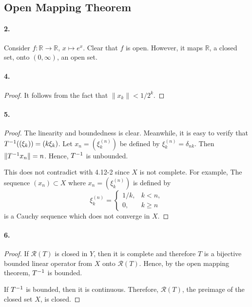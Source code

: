 \subsection{Open Mapping Theorem}
  \paragraph{2.}
  \begin{solution}
    Consider $f:\mathbb{R}\to\mathbb{R}$, $x\mapsto e^x$. Clear that $f$ is 
    open. However, it maps $\mathbb{R}$, a closed set, onto $(0,\infty)$, an 
    open set.
  \end{solution}
  
  \paragraph{4.}
  \begin{proof}
    It follows from the fact that $\|x_k\|<1/2^k$.
  \end{proof}
  
  \paragraph{5.}
  \begin{proof}
    The linearity and boundedness is clear. Meanwhile, it is easy to verify that
    $T^{-1}((\xi_k))=(k\xi_k)$. Let $x_n=(\xi_k^{(n)})$ be defined by $\xi_k
    ^{(n)}=\delta_{nk}$. Then $\|T^{-1} x_n\|=n$. Hence, $T^{-1}$ is unbounded.
    \par 
    This does not contradict with 4.12-2 since $X$ is not complete. For example,
    The sequence $(x_n)\subset X$ where $x_n=(\xi_k^{(n)})$ is defined by
    \[
      \xi_k^{(n)}=\begin{cases}
        1/k, & k<n, \\
        0,   & k\ge n
      \end{cases}
    \]
    is a Cauchy sequence which does not converge in $X$.
  \end{proof}
  
  \paragraph{6.}
  \begin{proof}
    If $\mathcal{R}(T)$ is closed in $Y$, then it is complete and therefore $T$
    is a bijective bounded linear operator from $X$ onto $\mathcal{R}(T)$. 
    Hence, by the open mapping theorem, $T^{-1}$ is bounded.\par
    If $T^{-1}$ is bounded, then it is continuous. Therefore, $\mathcal{R}(T)$, 
    the preimage of the closed set $X$, is closed.
  \end{proof}
  

